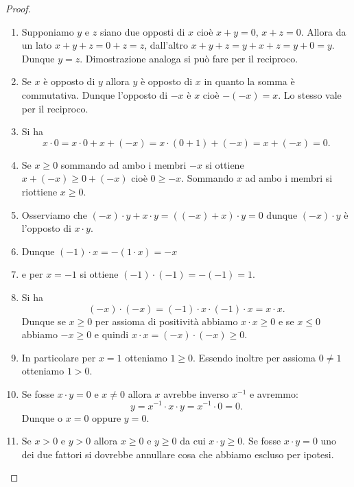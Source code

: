 \documentclass[italian,a4paper,oneside,headinclude]{scrbook}
\begin{document}
\begin{proof}
\begin{enumerate}
\item
Supponiamo $y$ e $z$ siano due opposti di $x$ cioè $x+y=0$, $x+z=0$.
Allora da un lato $x+y+z = 0+z = z$, dall'altro $x+y+z = y+x+z= y+ 0 = y$.
Dunque $y=z$. Dimostrazione analoga si può fare per il reciproco.

\item
Se $x$ è opposto di $y$ allora $y$ è opposto di $x$ in quanto la somma
è commutativa. Dunque l'opposto di $-x$ è $x$ cioè $-(-x)=x$. Lo stesso
vale per il reciproco.

\item
Si ha
\[
x\cdot 0 = x \cdot 0 + x + (-x) %
=x\cdot(0+1) + (-x) = x + (-x) = 0.
\]

\item
Se $x\ge 0$ sommando ad ambo i membri $-x$ si ottiene $x+(-x) \ge 0 + (-x)$
cioè $0 \ge -x$. Sommando $x$ ad ambo i membri si riottiene $x\ge 0$.


\item
Osserviamo che $(-x)\cdot y + x\cdot y = ((-x)+x)\cdot y = 0$ dunque $(-x)\cdot y$ è l'opposto di $x\cdot y$.

\item
Dunque $(-1)\cdot x = - (1 \cdot x) = - x$

\item
e per $x=-1$ si ottiene $(-1)\cdot(-1) = -(-1) = 1$.

\item
Si ha
\[
(-x)\cdot(-x) = (-1)\cdot x \cdot (-1)\cdot x = x\cdot x.
\]
Dunque se $x\ge 0$ per assioma di positività
abbiamo $x\cdot x\ge 0$ e se $x\le 0$ abbiamo $-x\ge 0$ e quindi
$x\cdot x = (-x)\cdot(-x) \ge 0$.

\item
In particolare per $x=1$ otteniamo $1\ge 0$.
Essendo inoltre per assioma $0\neq 1$ otteniamo $1> 0$.

\item
Se fosse $x\cdot y = 0$ e $x\neq 0$ allora $x$ avrebbe inverso $x^{-1}$
e avremmo:
\[
  y = x^{-1} \cdot x \cdot y = x^{-1}\cdot 0 = 0.
\]
Dunque o $x=0$ oppure $y=0$.

\item
Se $x>0$ e $y>0$ allora $x\ge 0$ e $y\ge 0$ da cui $x\cdot y\ge 0$.
Se fosse $x\cdot y=0$ uno dei due fattori si dovrebbe annullare
cosa che abbiamo escluso per ipotesi.
\end{enumerate}
\end{proof}
\end{document}
